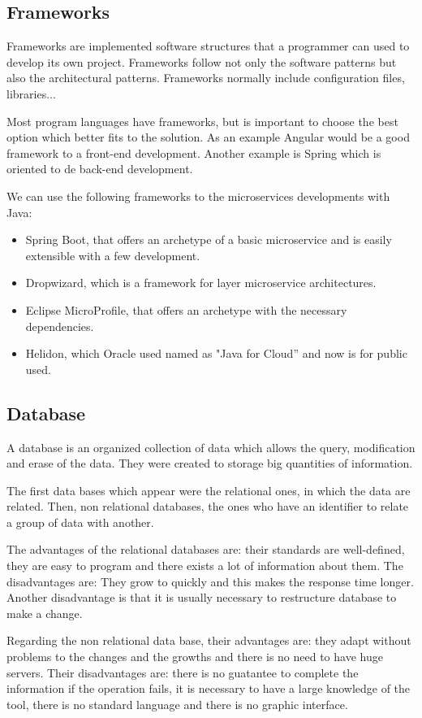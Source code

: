 \documentclass[12pt]{report} %
\begin{document}
\subsection{Frameworks}

Frameworks are implemented software structures that a programmer can used to develop its own project. Frameworks follow not only the software patterns but also the architectural patterns. Frameworks normally include configuration files, libraries...

Most program languages have frameworks, but is important to choose the best option which better fits to the solution. As an example Angular would be a good framework to a front-end development. Another example is Spring which is oriented to de back-end development.

We can use the following frameworks to the microservices developments with Java:
\begin{itemize}
	\item Spring Boot, that offers an archetype of a basic microservice and is easily extensible with a
	few development.
	\item Dropwizard, which is a framework for layer microservice architectures.
	\item Eclipse MicroProfile, that offers an archetype with the necessary dependencies.
	\item Helidon, which Oracle used named as "Java for Cloud” and now is for public used.
\end{itemize}

\subsection{Database}
A database is an organized collection of data which allows the query, modification and erase of the data. They were created to storage big quantities of information.

The first data bases which appear were the relational ones, in which the data are related. Then, non relational databases, the ones who have an identifier to relate a group of data with another.

The advantages of the relational databases are: their standards are well-defined, they are easy to program and there exists a lot of information about them. The disadvantages are: They grow to quickly and this makes the response time longer. Another disadvantage is that it is usually necessary to restructure database to make a change.

Regarding the non relational data base, their advantages are: they adapt without problems to the changes and the growths and there is no need to have huge servers. Their disadvantages are: there is no guatantee to complete the information if the operation fails, it is necessary to have a large knowledge of the tool, there is no standard language and there is no graphic interface.
\end{document}
